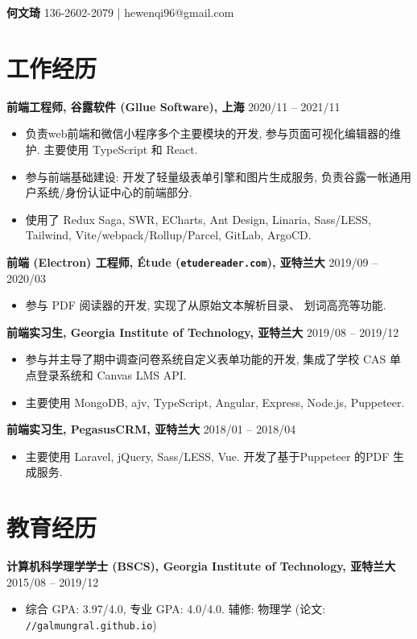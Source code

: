 \documentclass[10pt]{article}
\begin{document}
{\bf\huge 何文琦} \hfill 136-2602-2079 | hewenqi96@gmail.com

\section*{工作经历}
\textbf{前端工程师, 谷露软件 (Gllue Software), 上海} \hfill 2020/11 -- 2021/11
\begin{itemize}
\item 负责web前端和微信小程序多个主要模块的开发, 参与页面可视化编辑器的维护. 主要使用 TypeScript 和 React.
\item 参与前端基础建设: 开发了轻量级表单引擎和图片生成服务, 负责谷露一帐通用户系统/身份认证中心的前端部分.
\item {\small 使用了 Redux Saga, SWR, ECharts, Ant Design, Linaria, Sass/LESS, Tailwind, Vite/webpack/Rollup/Parcel, GitLab, ArgoCD.}
\end{itemize}

\vspace{0.5em}
\textbf{前端 (Electron) 工程师, Étude (\texttt{etudereader.com}), 亚特兰大} \hfill 2019/09 -- 2020/03
\begin{itemize}
\item 参与 PDF 阅读器的开发, 实现了从原始文本解析目录、 划词高亮等功能.
\end{itemize}

\vspace{0.5em}
\textbf{前端实习生, Georgia Institute of Technology, 亚特兰大} \hfill 2019/08 -- 2019/12
\begin{itemize}
\item 参与并主导了期中调查问卷系统自定义表单功能的开发, 集成了学校 CAS 单点登录系统和 Canvas LMS API.
\item 主要使用 MongoDB, ajv, TypeScript, Angular, Express,  Node.js, Puppeteer.
\end{itemize}

\vspace{0.5em}
\textbf{前端实习生, PegasusCRM, 亚特兰大} \hfill 2018/01 -- 2018/04
\begin{itemize}
\item 主要使用 Laravel, jQuery, Sass/LESS, Vue.  开发了基于Puppeteer 的PDF 生成服务.
\end{itemize}


\section*{教育经历}
\textbf{计算机科学理学学士 (BSCS), Georgia Institute of Technology, 亚特兰大} \hfill 2015/08 -- 2019/12
\begin{itemize}
\item  综合 GPA: 3.97/4.0, 专业 GPA: 4.0/4.0. 辅修: 物理学 (论文: \texttt{//galmungral.github.io})
\end{itemize} 
\end{document}
